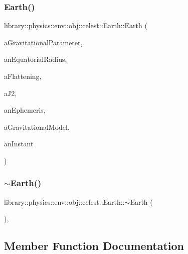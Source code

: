 \subsubsection{\texorpdfstring{Earth()}{Earth()}}
{\footnotesize\ttfamily library\+::physics\+::env\+::obj\+::celest\+::\+Earth\+::\+Earth (\begin{DoxyParamCaption}\item[{const \hyperlink{classlibrary_1_1physics_1_1units_1_1_derived}{Derived} \&}]{a\+Gravitational\+Parameter,  }\item[{const \hyperlink{classlibrary_1_1physics_1_1units_1_1_length}{Length} \&}]{an\+Equatorial\+Radius,  }\item[{const Real \&}]{a\+Flattening,  }\item[{const Real \&}]{a\+J2,  }\item[{const Shared$<$ \hyperlink{classlibrary_1_1physics_1_1env_1_1_ephemeris}{Ephemeris} $>$ \&}]{an\+Ephemeris,  }\item[{const Shared$<$ \hyperlink{namespacelibrary_1_1physics_1_1env_1_1obj_1_1celest_ac63145c8cbe868bd79be8f6f423c8cf4}{Gravitational\+Model} $>$ \&}]{a\+Gravitational\+Model,  }\item[{const \hyperlink{classlibrary_1_1physics_1_1time_1_1_instant}{Instant} \&}]{an\+Instant }\end{DoxyParamCaption})}

\mbox{\label{classlibrary_1_1physics_1_1env_1_1obj_1_1celest_1_1_earth_a93fbd2015a7c7d786654919197c63963}} 
\subsubsection{\texorpdfstring{$\sim$\+Earth()}{~Earth()}}
{\footnotesize\ttfamily library\+::physics\+::env\+::obj\+::celest\+::\+Earth\+::$\sim$\+Earth (\begin{DoxyParamCaption}{ }\end{DoxyParamCaption})\hspace{0.3cm}{\ttfamily [override]}, {\ttfamily [virtual]}}



\subsection{Member Function Documentation}
\mbox{\label{classlibrary_1_1physics_1_1env_1_1obj_1_1celest_1_1_earth_aca39bec00a2046a3fcef9bf22be52428}} 
